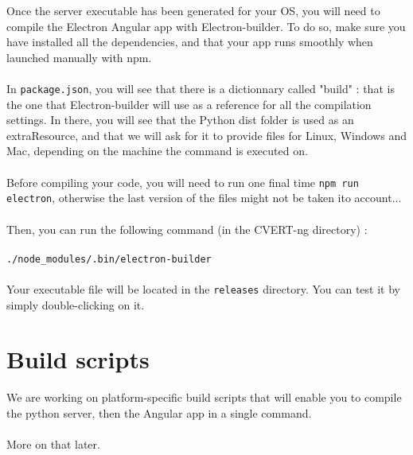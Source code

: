 \documentclass[12pt,a4paper]{article}
\begin{document}
Once the server executable has been generated for your OS, you will need to compile the Electron Angular app with Electron-builder. To do so, make sure you have installed all the dependencies, and that your app runs smoothly when launched manually with npm.\\
~\\
In \texttt{package.json}, you will see that there is a dictionnary called "build" : that is the one that Electron-builder will use as a reference for all the compilation settings. In there, you will see that the Python dist folder is used as an extraResource, and that we will ask for it to provide files for Linux, Windows and Mac, depending on the machine the command is executed on.\\
~\\
Before compiling your code, you will need to run one final time \texttt{npm run electron}, otherwise the last version of the files might not be taken ito account...\\
~\\
Then, you can run the following command (in the CVERT-ng directory) :\\
~\\
\texttt{./node\_modules/.bin/electron-builder}\\
~\\
Your executable file will be located in the \texttt{releases} directory. You can test it by simply double-clicking on it.

\section{Build scripts}

We are working on platform-specific build scripts that will enable you to compile the python server, then the Angular app in a single command.\\
~\\
More on that later.
\end{document}
